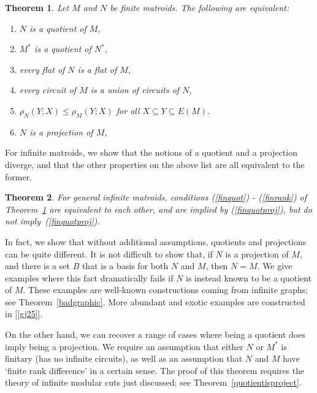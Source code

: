 \documentclass{amsart}
\theoremstyle{plain}
\newtheorem{theorem}{Theorem}[section]
\theoremstyle{definition}
\renewcommand{\le}{\leqslant}
\renewcommand{\ss}{\subseteq}
\newcommand{\relrank}[3]{\rho_{#1}({#2};{#3})}
\begin{document}
\begin{theorem}\label{finquotequiv}
  Let $M$ and $N$ be finite matroids. The following are equivalent: 
  \begin{enumerate}[(1)]
    \item\label{finquot} $N$ is a quotient of $M$,
    \item\label{finprojdual} $M^*$ is a quotient of $N^*$,
    \item\label{finflat} every flat of $N$ is a flat of $M$,
    \item\label{fincircuit} every circuit of $M$ is a union of circuits of $N$,
    \item\label{finrank} $\relrank{N}{Y}{X} \le \relrank{M}{Y}{X}$ for all $X \ss Y \ss E(M)$. 
    \item\label{finquotproj} $N$ is a projection of $M$,
  \end{enumerate}
\end{theorem}

For infinite matroids, we show that the notions of a quotient and a projection diverge, 
and that the other properties on the above list are all equivalent to the former. 

\begin{theorem}\label{quotprojectequiv}
  For general infinite matroids, conditions (\ref{finquot}) - (\ref{finrank}) of Theorem~\ref{finquotequiv} are equivalent
  to each other, and are implied by (\ref{finquotproj}), but do not imply~(\ref{finquotproj}). 
\end{theorem}

In fact, we show that without additional assumptions, quotients and projections can be quite different. 
It is not difficult to show that, if $N$ is a projection of $M$, and there is a set $B$ that is a basis
for both $N$ and $M$, then $N = M$. We give examples where this fact dramatically fails if $N$ is instead
known to be a quotient of $M$. These examples are well-known constructions coming from infinite graphs; 
see Theorem~\ref{badgraphic}. More abundant and exotic examples are constructed in [\ref{gj25}]. 

On the other hand, we can recover a range of cases where being a quotient does imply being a projection. 
We require an assumption that either $N$ or $M^*$ is finitary (has no infinite circuits), 
as well as an assumption that $N$ and $M$ have `finite rank difference' in a certain sense. 
The proof of this theorem requires the theory of infinite modular cuts just discussed; 
see Theorem~\ref{quotientisproject}.
\end{document}
